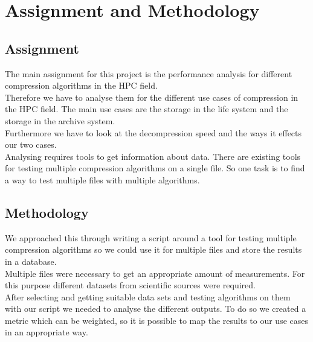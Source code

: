 \documentclass[
	12pt,
	a4paper,
	BCOR10mm,
	DIV14,
	listof=totoc,
	bibliography=totoc,
	headsepline
]{scrreprt}
\begin{document}
\chapter{Assignment and Methodology}
\label{Assignment and Methodology}
\section*{Assignment}
The main assignment for this project is the performance analysis for different compression algorithms in the HPC field. 
\\
Therefore we have to analyse them for the different use cases of compression in the HPC field. 
The main use cases are the storage in the life system and the storage in the archive system.
\\
Furthermore we have to look at the decompression speed and the ways it effects our two cases. 
\\
Analysing requires tools to get information about data. There are existing tools for testing multiple compression algorithms on a single file. So one task is to find a way to test multiple files with multiple algorithms.


\section*{Methodology}
We approached this through writing a script around a tool for testing multiple compression algorithms so we could use it for multiple files and store the results in a database. 
\\
Multiple files were necessary to get an appropriate amount of measurements.
For this purpose different datasets from scientific sources were required.
\\
After selecting and getting suitable data sets and testing algorithms on them with our script we needed to analyse the different outputs.
To do so we created a metric which can be weighted, so it is possible to map the results to our use cases in an appropriate way. \\
\end{document}
